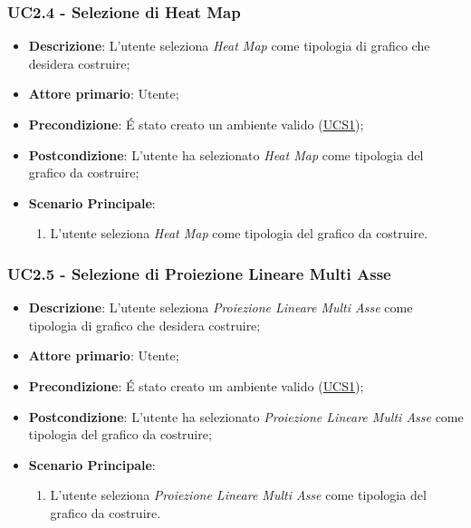\subsubsection{UC2.4 - Selezione di Heat Map}
\label{ssub:uc2.4}
\begin{itemize}

	\item \textbf{Descrizione}: L’utente seleziona \emph{Heat Map} come tipologia di grafico che desidera 
	costruire;

    \item \textbf{Attore primario}: Utente;

	\item \textbf{Precondizione}:   É stato creato un ambiente valido (\hyperref[sub:uc1]{UCS1});

    \item \textbf{Postcondizione}:  L'utente ha selezionato \emph{Heat Map} come tipologia del grafico da 
	costruire;

	\item \textbf{Scenario Principale}: 
	\begin{enumerate}
		\item L'utente seleziona \emph{Heat Map} come tipologia del grafico da costruire.
	\end{enumerate}

\end{itemize}


\subsubsection{UC2.5 - Selezione di Proiezione Lineare Multi Asse}
\label{ssub:uc2.5}
\begin{itemize}

	\item \textbf{Descrizione}: L’utente seleziona \emph{Proiezione Lineare Multi Asse} come tipologia di grafico che 
	desidera costruire;

    \item \textbf{Attore primario}: Utente;

    \item \textbf{Precondizione}:   É stato creato un ambiente valido (\hyperref[sub:uc1]{UCS1});

	\item \textbf{Postcondizione}:  L'utente ha selezionato \emph{Proiezione Lineare Multi Asse} come tipologia del 
	grafico da costruire;
	
	\item \textbf{Scenario Principale}: 
	\begin{enumerate}
		\item L'utente seleziona \emph{Proiezione Lineare Multi Asse} come tipologia del grafico da costruire.
	\end{enumerate}
\end{itemize}

